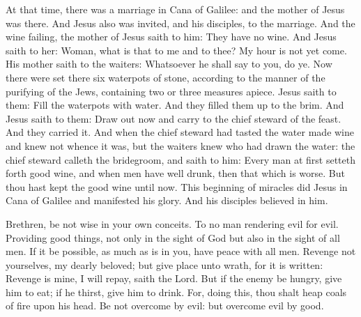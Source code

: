 \begin{multicols}{2}
At that time, there was a marriage in Cana of Galilee: and the mother of
Jesus was there.  And Jesus also was invited, and his disciples, to the
marriage.  And the wine failing, the mother of Jesus saith to him: They have no
wine.  And Jesus saith to her: Woman, what is that to me and to thee? My hour
is not yet come.   His mother saith to the waiters:
Whatsoever he shall say to you, do ye.  Now there were set there six waterpots
of stone, according to the manner of the purifying of the Jews, containing two
or three measures apiece.  Jesus saith to them: Fill the waterpots with water.
And they filled them up to the brim.  And Jesus saith to them: Draw out now and
carry to the chief steward of the feast. And they carried it.  And when the
chief steward had tasted the water made wine and knew not whence it was, but
the waiters knew who had drawn the water: the chief steward calleth the
bridegroom, and saith to him: Every man at first setteth forth good wine, and
when men have well drunk, then that which is worse.  But thou hast kept the
good wine until now.  This beginning of miracles did Jesus in Cana of Galilee
and manifested his glory. And his disciples believed in him.



\bigskip



Brethren, %
be not wise in your own conceits.  To no man rendering evil for
evil. Providing good things, not only in the sight of God but also in the sight
of all men.  If it be possible, as much as is in you, have peace with all men.
Revenge not yourselves, my dearly beloved; but give place unto wrath, for it is
written: Revenge is mine, I will repay, saith the Lord.  But if the enemy be
hungry, give him to eat; if he thirst, give him to drink. For, doing this, thou
shalt heap coals of fire upon his head.  Be not overcome by evil: but overcome
evil by good.




\end{multicols}
